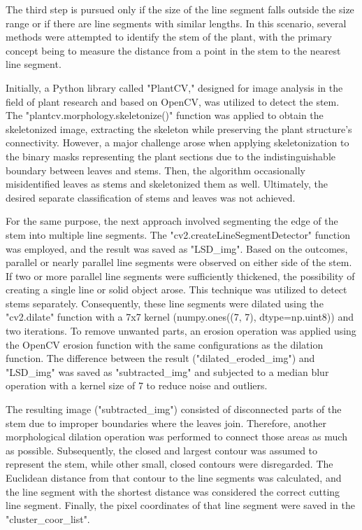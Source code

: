 \documentclass[]{iat}
\begin{document}
\par
The third step is pursued only if the size of the line segment falls outside the size range or if there are line segments with similar lengths. In this scenario, several methods were attempted to identify the stem of the plant, with the primary concept being to measure the distance from a point in the stem to the nearest line segment.
\par
Initially, a Python library called "PlantCV," designed for image analysis in the field of plant research and based on OpenCV, was utilized to detect the stem. The "plantcv.morphology.skeletonize()" function was applied to obtain the skeletonized image, extracting the skeleton while preserving the plant structure's connectivity. However, a major challenge arose when applying skeletonization to the binary masks representing the plant sections due to the indistinguishable boundary between leaves and stems. Then, the algorithm occasionally misidentified leaves as stems and skeletonized them as well. Ultimately, the desired separate classification of stems and leaves  was not achieved.
\par
For the same purpose, the next approach involved segmenting the edge of the stem into multiple line segments. The "cv2.createLineSegmentDetector" function was employed, and the result was saved as "LSD\_img". Based on the outcomes, parallel or nearly parallel line segments were observed on either side of the stem. If two or more parallel line segments were sufficiently thickened, the possibility of creating a single line or solid object arose. This technique was utilized to detect stems separately. Consequently, these line segments were dilated using the "cv2.dilate" function with a 7x7 kernel (numpy.ones((7, 7), dtype=np.uint8)) and two iterations. To remove unwanted parts, an erosion operation was applied using the OpenCV erosion function with the same configurations as the dilation function. The difference between the result ("dilated\_eroded\_img") and "LSD\_img" was saved as "subtracted\_img" and subjected to a median blur operation with a kernel size of 7 to reduce noise and outliers.
\par
The resulting image ("subtracted\_img") consisted of disconnected parts of the stem due to improper boundaries where the leaves join. Therefore, another morphological dilation operation was performed to connect those areas as much as possible. Subsequently, the closed and largest contour was assumed to represent the stem, while other small, closed contours were disregarded. The Euclidean distance from that contour to the line segments was calculated, and the line segment with the shortest distance was considered the correct cutting line segment. Finally, the pixel coordinates of that line segment were saved in the "cluster\_coor\_list".
\par
\end{document}
